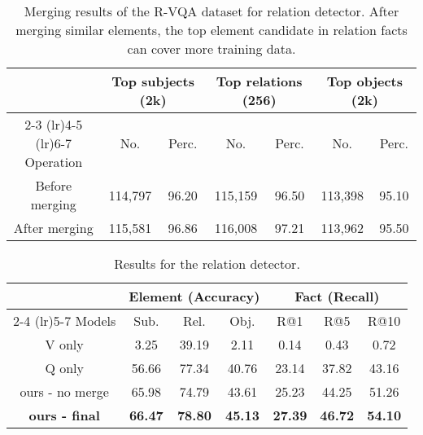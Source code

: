 \documentclass[sigconf]{acmart}
\begin{document}
\begin{table}[t]
	\centering 
\footnotesize
\begin{tabular}{*7{c}} 
		\toprule	
		\multirow{2}{*}{}	& \multicolumn{2}{c}{Top subjects (2k)} 	& \multicolumn{2}{c}{Top relations (256)} 	& \multicolumn{2}{c}{Top objects (2k)}  \\
		\cmidrule(lr){2-3} 	\cmidrule(lr){4-5} 	  \cmidrule(lr){6-7} 	
		Operation    	&  No.   &   Perc. 		&  No.   &   Perc. 		&  No.   &   Perc.   \\
		\midrule
		Before merging    &  114,797   &   96.20   & 115,159   &   96.50		&   113,398   &   95.10  \\
		After merging  	& 115,581   &   96.86 	& 116,008   &   97.21 	& 113,962  &   95.50 \\
		\bottomrule		
	\end{tabular}
	\caption{Merging results of the R-VQA dataset for relation detector. After merging similar elements, the top element candidate in relation facts can cover more training data.}
	\label{tab:detector-data}
\end{table}





\begin{table}[t]
	\centering 
	\small
	\begin{tabular}{*7{c}} 
		\toprule	
		\multirow{2}{*}{}	
		& \multicolumn{3}{c}{Element (Accuracy)} 	
		& \multicolumn{3}{c}{Fact (Recall)}  \\
		\cmidrule(lr){2-4} 	\cmidrule(lr){5-7} 	
		Models  	&  Sub.   &   Rel.	&  Obj.&  R@1 & R@5	&  R@10  \\
		\midrule
		V only 		& 3.25	& 39.19	& 2.11   	& 0.14 & 0.43 & 0.72  \\
		Q only 		& 56.66	& 77.34	& 40.76 	& 23.14	& 37.82	& 43.16  \\
		\midrule
		ours - no merge 		& 65.98	& 74.79	& 43.61 	& 25.23	& 44.25	& 51.26  \\
		\textbf{ours - final}	& \textbf{66.47} & \textbf{78.80} & \textbf{45.13} 	
		& \textbf{27.39} & \textbf{46.72} & \textbf{54.10}  \\
		\bottomrule		
	\end{tabular}
	\caption{Results for the relation detector.}
	\label{tab:detector-result}
\end{table}
\end{document}
